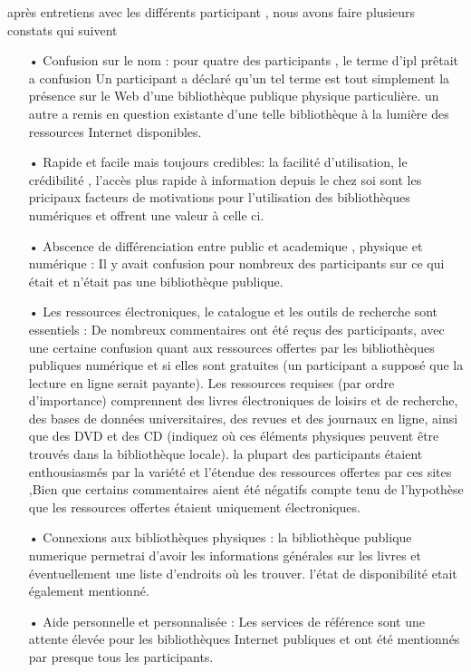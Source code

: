 \documentclass[french,a4paper,12pt]{article}
\begin{document}
après entretiens avec les différents participant , nous avons faire plusieurs constats qui suivent 
\begin{enumerate}

\item[•] Confusion sur le nom :  pour quatre des participants , le terme d'ipl prêtait a confusion  Un participant a déclaré qu'un tel terme est tout simplement la présence sur le Web d'une bibliothèque publique physique particulière. un autre a remis  en question existante d'une telle bibliothèque  à la lumière des ressources Internet disponibles.

\item[•] Rapide et facile mais toujours credibles: la facilité d'utilisation,  le crédibilité  , l'accès plus rapide à information depuis le chez soi sont les pricipaux facteurs de motivations pour l'utilisation des bibliothèques numériques et offrent une valeur à celle ci.

\item[•] Abscence de différenciation entre public et academique , physique et numérique : Il y avait confusion pour nombreux des  participants sur ce qui était et n'était pas une bibliothèque publique.
 
\item[•] Les ressources électroniques, le catalogue et les outils de recherche sont essentiels : De nombreux commentaires ont été reçus des participants, avec une certaine confusion quant aux ressources offertes par les bibliothèques  publiques numérique et si elles sont gratuites (un participant a supposé que la lecture en ligne serait payante). Les ressources requises (par ordre d'importance) comprennent des livres électroniques de loisirs et de recherche, des bases de données universitaires, des revues et des journaux en ligne, ainsi que des DVD et des CD (indiquez où ces éléments physiques peuvent être trouvés dans la bibliothèque locale).  la plupart des participants étaient enthousiasmés par la variété et l'étendue des ressources offertes par ces sites ,Bien que certains commentaires aient été négatifs compte tenu de l'hypothèse que les ressources offertes étaient uniquement électroniques. 

\item[•] Connexions aux bibliothèques physiques : la bibliothèque publique numerique permetrai d'avoir les informations générales sur les livres et éventuellement une liste d'endroits où les trouver. l'état de disponibilité etait également mentionné.

\item[•] Aide personnelle et personnalisée : Les services de référence sont une attente élevée pour les bibliothèques Internet publiques et ont été mentionnés par presque tous les participants.
\end{enumerate}
\end{document}
